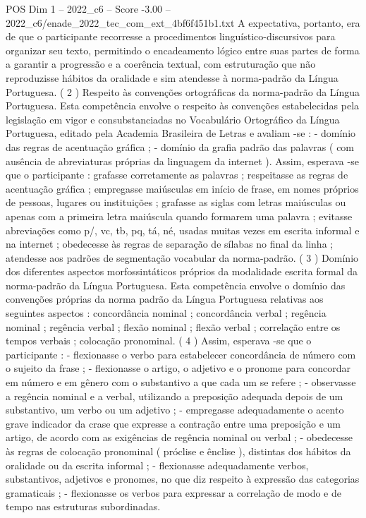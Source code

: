 \begin{textsample}{POS Dim 1 – 2022\_c6 – Score -3.00 – 2022\_c6/enade\_2022\_tec\_com\_ext\_4bf6f451b1.txt}
A expectativa, portanto, era de que o participante recorresse a procedimentos linguístico-discursivos para organizar seu texto, permitindo o encadeamento lógico entre suas partes de forma a garantir a progressão e a coerência textual, com estruturação que não reproduzisse hábitos da oralidade e sim atendesse à norma-padrão da Língua Portuguesa. ( 2 ) Respeito às convenções ortográficas da norma-padrão da Língua Portuguesa.
Esta competência envolve o respeito às convenções estabelecidas pela legislação em vigor e consubstanciadas no Vocabulário Ortográfico da Língua Portuguesa, editado pela Academia Brasileira de Letras e avaliam -se : - domínio das regras de acentuação gráfica ; - domínio da grafia padrão das palavras ( com ausência de abreviaturas próprias da linguagem da internet ).
Assim, esperava -se que o participante : grafasse corretamente as palavras ; respeitasse as regras de acentuação gráfica ; empregasse maiúsculas em início de frase, em nomes próprios de pessoas, lugares ou instituições ; grafasse as siglas com letras maiúsculas ou apenas com a primeira letra maiúscula quando formarem uma palavra ; evitasse abreviações como p/, vc, tb, pq, tá, né, usadas muitas vezes em escrita informal e na internet ; obedecesse às regras de separação de sílabas no final da linha ; atendesse aos padrões de segmentação vocabular da norma-padrão. ( 3 ) Domínio dos diferentes aspectos morfossintáticos próprios da modalidade escrita formal da norma-padrão da Língua Portuguesa.
Esta competência envolve o domínio das convenções próprias da norma padrão da Língua Portuguesa relativas aos seguintes aspectos : concordância nominal ; concordância verbal ; regência nominal ; regência verbal ; flexão nominal ; flexão verbal ; correlação entre os tempos verbais ; colocação pronominal. ( 4 ) Assim, esperava -se que o participante : - flexionasse o verbo para estabelecer concordância de número com o sujeito da frase ; - flexionasse o artigo, o adjetivo e o pronome para concordar em número e em gênero com o substantivo a que cada um se refere ; - observasse a regência nominal e a verbal, utilizando a preposição adequada depois de um substantivo, um verbo ou um adjetivo ; - empregasse adequadamente o acento grave indicador da crase que expresse a contração entre uma preposição e um artigo, de acordo com as exigências de regência nominal ou verbal ; - obedecesse às regras de colocação pronominal ( próclise e ênclise ), distintas dos hábitos da oralidade ou da escrita informal ; - flexionasse adequadamente verbos, substantivos, adjetivos e pronomes, no que diz respeito à expressão das categorias gramaticais ; - flexionasse os verbos para expressar a correlação de modo e de tempo nas estruturas subordinadas.

\end{textsample}
